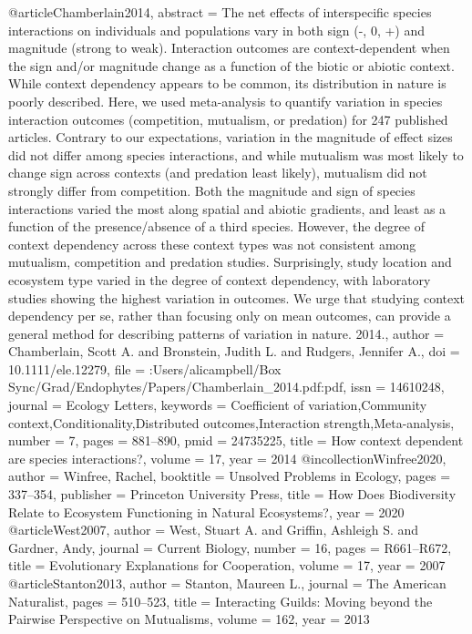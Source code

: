 @article{Chamberlain2014,
abstract = {The net effects of interspecific species interactions on individuals and populations vary in both sign (-, 0, +) and magnitude (strong to weak). Interaction outcomes are context-dependent when the sign and/or magnitude change as a function of the biotic or abiotic context. While context dependency appears to be common, its distribution in nature is poorly described. Here, we used meta-analysis to quantify variation in species interaction outcomes (competition, mutualism, or predation) for 247 published articles. Contrary to our expectations, variation in the magnitude of effect sizes did not differ among species interactions, and while mutualism was most likely to change sign across contexts (and predation least likely), mutualism did not strongly differ from competition. Both the magnitude and sign of species interactions varied the most along spatial and abiotic gradients, and least as a function of the presence/absence of a third species. However, the degree of context dependency across these context types was not consistent among mutualism, competition and predation studies. Surprisingly, study location and ecosystem type varied in the degree of context dependency, with laboratory studies showing the highest variation in outcomes. We urge that studying context dependency per se, rather than focusing only on mean outcomes, can provide a general method for describing patterns of variation in nature. {\textcopyright} 2014.},
author = {Chamberlain, Scott A. and Bronstein, Judith L. and Rudgers, Jennifer A.},
doi = {10.1111/ele.12279},
file = {:Users/alicampbell/Box Sync/Grad/Endophytes/Papers/Chamberlain_2014.pdf:pdf},
issn = {14610248},
journal = {Ecology Letters},
keywords = {Coefficient of variation,Community context,Conditionality,Distributed outcomes,Interaction strength,Meta-analysis},
number = {7},
pages = {881--890},
pmid = {24735225},
title = {{How context dependent are species interactions?}},
volume = {17},
year = {2014}
}
@incollection{Winfree2020,
author = {Winfree, Rachel},
booktitle = {Unsolved Problems in Ecology},
pages = {337--354},
publisher = {Princeton University Press},
title = {{How Does Biodiversity Relate to Ecosystem Functioning in Natural Ecosystems?}},
year = {2020}
}
@article{West2007,
author = {West, Stuart A. and Griffin, Ashleigh S. and Gardner, Andy},
journal = {Current Biology},
number = {16},
pages = {R661--R672},
title = {{Evolutionary Explanations for Cooperation}},
volume = {17},
year = {2007}
}
@article{Stanton2013,
author = {Stanton, Maureen L.},
journal = {The American Naturalist},
pages = {510--523},
title = {{Interacting Guilds: Moving beyond the Pairwise Perspective on Mutualisms}},
volume = {162},
year = {2013}
}
